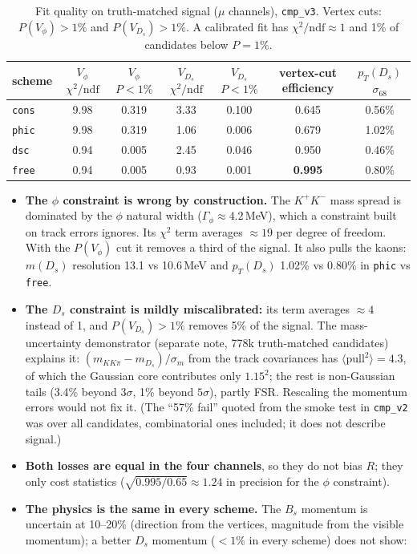 \documentclass[10pt,a4paper]{article}
\newcommand{\code}[1]{\texttt{#1}}
\newcommand{\Ds}{D_s}
\begin{document}
\begin{table}[H]
\centering\small
\caption{Fit quality on truth-matched signal ($\mu$ channels), \code{cmp\_v3}. Vertex cuts: $P(V_\phi)>1\%$ and
$P(V_{\Ds})>1\%$. A calibrated fit has $\chi^2/\text{ndf}\approx1$ and 1\% of candidates below $P=1\%$.}
\begin{tabular}{lcccccc}
\toprule
scheme & $V_\phi$ $\chi^2/\text{ndf}$ & $V_\phi$ $P<1\%$ & $V_{\Ds}$ $\chi^2/\text{ndf}$ & $V_{\Ds}$ $P<1\%$ &
  vertex-cut efficiency & $p_T(\Ds)$ $\sigma_{68}$ \\
\midrule
\code{cons} & 9.98 & 0.319 & 3.33 & 0.100 & 0.645 & 0.56\% \\
\code{phic} & 9.98 & 0.319 & 1.06 & 0.006 & 0.679 & 1.02\% \\
\code{dsc}  & 0.94 & 0.005 & 2.45 & 0.046 & 0.950 & 0.46\% \\
\code{free} & 0.94 & 0.005 & 0.93 & 0.001 & \textbf{0.995} & 0.80\% \\
\bottomrule
\end{tabular}
\end{table}

\begin{itemize}
\item \textbf{The $\phi$ constraint is wrong by construction.} The $K^+K^-$ mass spread is dominated by the $\phi$
  natural width ($\Gamma_\phi\approx4.2$\,MeV), which a constraint built on track errors ignores. Its $\chi^2$ term
  averages $\approx19$ per degree of freedom. With the $P(V_\phi)$ cut it removes a third of the signal. It also pulls
  the kaons: $m(\Ds)$ resolution 13.1 vs 10.6\,MeV and $p_T(\Ds)$ 1.02\% vs 0.80\% in \code{phic} vs \code{free}.
\item \textbf{The $\Ds$ constraint is mildly miscalibrated:} its term averages $\approx4$ instead of 1, and
  $P(V_{\Ds})>1\%$ removes 5\% of the signal. The mass-uncertainty demonstrator (separate note, 778k truth-matched
  candidates) explains it: $(m_{KK\pi}-m_{\Ds})/\sigma_m$ from the track covariances has $\langle\text{pull}^2\rangle=4.3$,
  of which the Gaussian core contributes only $1.15^2$; the rest is non-Gaussian tails (3.4\% beyond $3\sigma$, 1\%
  beyond $5\sigma$), partly FSR. Rescaling the momentum errors would not fix it. (The ``57\% fail'' quoted from the smoke test in \code{cmp\_v2} was over all
  candidates, combinatorial ones included; it does not describe signal.)
\item \textbf{Both losses are equal in the four channels}, so they do not bias $R$; they only cost statistics
  ($\sqrt{0.995/0.65}\approx1.24$ in precision for the $\phi$ constraint).
\item \textbf{The physics is the same in every scheme.} The $B_s$ momentum is uncertain at 10--20\% (direction from the
  vertices, magnitude from the visible momentum); a better $\Ds$ momentum ($<1\%$ in every scheme) does not show:
\end{itemize}
\end{document}
